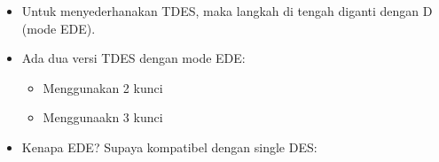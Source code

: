 \documentclass{article}
\begin{document}

\begin{itemize}
    \item Untuk menyederhanakan TDES, maka langkah di tengah diganti dengan D (mode EDE).
    \item Ada dua versi TDES dengan mode EDE:
    \begin{itemize}
        \item Menggunakan 2 kunci
        \item Menggunaakn 3 kunci
    \end{itemize}
    \item Kenapa EDE? Supaya kompatibel dengan single DES:
\end{itemize}
\end{document}
